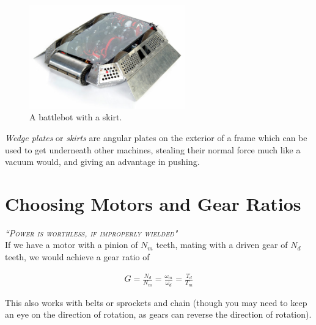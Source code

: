 \documentclass[10pt,letterpaper]{book}
\begin{document}
\begin{figure}[H]
	\includegraphics[width=0.6\textwidth]{imgs/drivetrain_skirt.jpeg}
	\caption{A battlebot with a skirt.}
\end{figure}

\textit{Wedge plates} or \textit{skirts} are angular plates on the exterior of a frame which can be used to get underneath other machines, stealing their normal force much like a vacuum would, and giving an advantage in pushing.



\chapter{Choosing Motors and Gear Ratios}

 {\slshape \scshape ``Power is worthless, if improperly wielded"}
 \\

If we have a motor with a pinion of $N_m$ teeth, mating with a driven gear of $N_d$ teeth, we would achieve a gear ratio of

\begin{align}
  G = \frac{N_d}{N_m} = \frac{\omega_m}{\omega_d} = \frac{T_d}{T_m}
\end{align}

This also works with belts or sprockets and chain (though you may need to keep an eye on the direction of rotation, as gears can reverse the direction of rotation).
\end{document}
